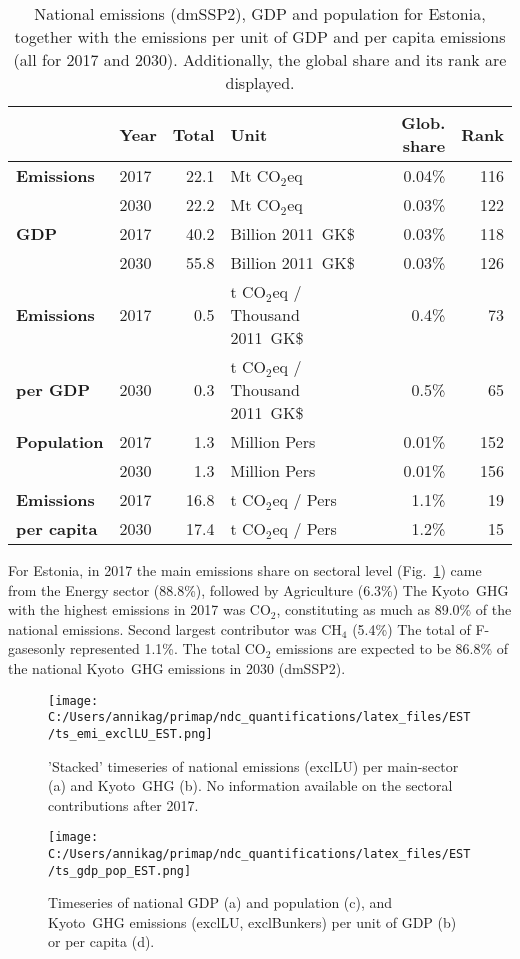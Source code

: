 \documentclass[12pt]{article}
\begin{document}
 \begin{table}[H]
 \centering
 \caption{National emissions (dmSSP2), GDP and population for Estonia, together with the emissions per unit of GDP and per capita emissions (all for 2017 and 2030). 
 Additionally, the global share and its rank are displayed.}
 \label{tab:overview}
 \begin{tabular}{l || l r l r r}
 \bfseries  & \bfseries Year & \bfseries Total & \bfseries Unit & \bfseries Glob. share & \bfseries Rank \tabularnewline \hline \hline
 \bfseries Emissions & 2017 & 22.1 & Mt CO$_2$eq & 0.04\% & 116 \tabularnewline 
 \bfseries  & 2030 & 22.2 & Mt CO$_2$eq & 0.03\% & 122 \tabularnewline \hline
 \bfseries GDP & 2017 & 40.2 & Billion 2011~GK\$ & 0.03\% & 118 \tabularnewline 
 \bfseries  & 2030 & 55.8 & Billion 2011~GK\$ & 0.03\% & 126 \tabularnewline \hline
 \bfseries Emissions & 2017 & 0.5 & t CO$_2$eq / Thousand 2011~GK\$ & 0.4\% & 73 \tabularnewline 
 \bfseries per GDP & 2030 & 0.3 & t CO$_2$eq / Thousand 2011~GK\$ & 0.5\% & 65 \tabularnewline \hline
 \bfseries Population & 2017 & 1.3 & Million Pers & 0.01\% & 152 \tabularnewline 
 \bfseries  & 2030 & 1.3 & Million Pers & 0.01\% & 156 \tabularnewline \hline
 \bfseries Emissions & 2017 & 16.8 & t CO$_2$eq /  Pers & 1.1\% & 19 \tabularnewline 
 \bfseries per capita & 2030 & 17.4 & t CO$_2$eq /  Pers & 1.2\% & 15 \tabularnewline 
 \end{tabular}
 \end{table}

 For Estonia, in 2017 the main emissions share on sectoral level (Fig.~\ref{fig:tsEmi}) came from the Energy sector (88.8\%), followed by Agriculture (6.3\%)
 The Kyoto~GHG with the highest emissions in 2017 was CO$_2$, constituting as much as 89.0\% of the national emissions. 
 Second largest contributor was CH$_4$ (5.4\%)
 The total of F-gasesonly represented 1.1\%.
 The total CO$_2$ emissions are expected to be 86.8\% of the national Kyoto~GHG emissions in 2030 (dmSSP2).

 \begin{figure}[H]
 \centering
 \texttt{[image: C:/Users/annikag/primap/ndc\_quantifications/latex\_files/EST/ts\_emi\_exclLU\_EST.png]}
 \caption{'Stacked' timeseries of national emissions (exclLU) per main-sector (a) and Kyoto~GHG (b). 
 No information available on the sectoral contributions after 2017.}
 \label{fig:tsEmi}
 \end{figure}

 \begin{figure}[H]
 \centering
 \texttt{[image: C:/Users/annikag/primap/ndc\_quantifications/latex\_files/EST/ts\_gdp\_pop\_EST.png]}
 \caption{Timeseries of national GDP (a) and population (c), and Kyoto~GHG emissions (exclLU, exclBunkers) per unit of GDP (b) or per capita (d).}
 \label{fig:tsSocioEco}
 \end{figure}
\end{document}
